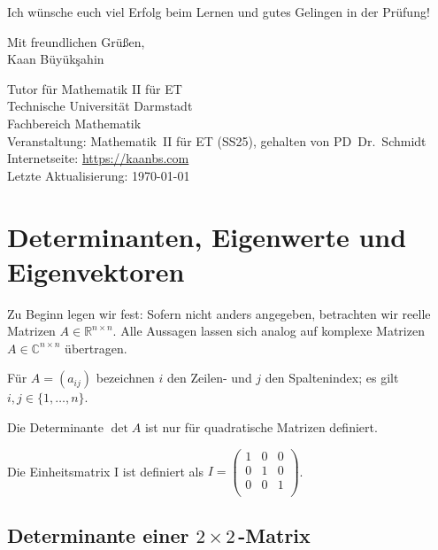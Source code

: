 \documentclass[a4paper,11pt,oneside,open=any,parskip=half, DIV=15]{scrreprt}
\begin{document}
   \vspace{1em}
   Ich wünsche euch viel Erfolg beim Lernen und gutes Gelingen in der Prüfung!

   \vspace{0.5em}
   Mit freundlichen Grüßen,\\
   Kaan Büyükşahin

   \vspace{1em}
   Tutor für Mathematik II für ET\\
   Technische Universität Darmstadt\\
   Fachbereich Mathematik\\
   Veranstaltung: Mathematik~II für ET (SS25), gehalten von PD~Dr.\ Schmidt\\
   Internetseite: \url{https://kaanbs.com}\\
   Letzte Aktualisierung: \today

\tableofcontents
\cleardoublepage{}


\chapter{Determinanten, Eigenwerte und Eigenvektoren}

   Zu Beginn legen wir fest: Sofern nicht anders angegeben, betrachten wir reelle Matrizen
   \(A \in \mathbb{R}^{n\times n}\). Alle Aussagen lassen sich analog auf komplexe Matrizen
   \(A \in \mathbb{C}^{n\times n}\) übertragen.

   Für \(A=(a_{ij})\) bezeichnen \(i\) den Zeilen- und \(j\) den Spaltenindex; es gilt
   \(i,j \in \{1,\dots,n\}\).

   Die Determinante \(\det A\) ist nur für quadratische Matrizen definiert.

   Die Einheitsmatrix I ist definiert als \( I = \begin{pmatrix}
      1 & 0 & 0\\
      0 & 1 & 0\\
      0 & 0 & 1\\
   \end{pmatrix} \).

\section{Determinante einer \texorpdfstring{\(2\times 2\)\,-Matrix}{2x2-Matrix}} %
\end{document}
